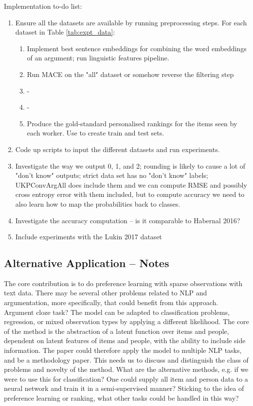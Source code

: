 Implementation to-do list:
\begin{enumerate}
  \item Ensure all the datasets are available by running preprocessing steps.
  For each dataset in Table \ref{tab:expt_data}:
  \begin{enumerate}
    \item Implement best sentence embeddings for combining the word embeddings of an argument; run linguistic features pipeline.
    \item Run MACE on the "all" dataset or somehow reverse the filtering step
    \item -
    \item - 
    \item Produce the gold-standard personalised rankings for the items seen by each worker. Use to create train and test sets.
  \end{enumerate}
  \item Code up scripts to input the different datasets and run experiments.
  \item Investigate the way we output 0, 1, and 2; rounding is likely to cause a lot of "don't know" outputs; strict data set has no "don't know" labels; UKPConvArgAll does include them and we can compute
  RMSE and possibly cross entropy error with them included, but to compute accuracy we need to 
  also learn how to map the probabilities back to classes.
  \item Investigate the accuracy computation -- is it comparable to Habernal 2016? 
  \item Include experiments with the Lukin 2017 dataset 
\end{enumerate}

\subsection{Alternative Application -- Notes}

The core contribution is to do preference learning with sparse observations with text data. 
There may be several other problems related to NLP and argumentation, more specifically, that
could benefit from this approach. 
Argument cloze task? 
The model can be adapted to classification problems, regression, or mixed observation types by applying a different likelihood. The core of the method is the abstraction of a latent function over items and people, dependent on latent features of items and people, with the ability to include side information.
The paper could therefore apply the model to multiple NLP tasks, and be a methodology paper. 
This needs us to discuss and distinguish the class of problems and novelty of the method. 
What are the alternative methods, e.g. if we were to use this for classification? One could supply all 
item and person data to a neural network and train it in a semi-supervised manner?
Sticking to the idea of preference learning or ranking, what other tasks could be handled in this way?
